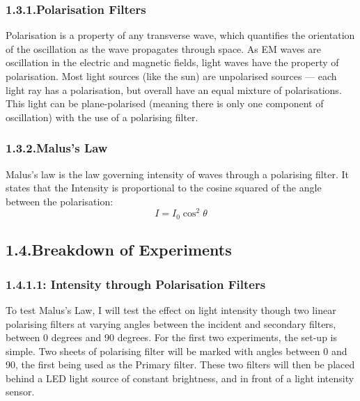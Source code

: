 \documentclass{article}
\begin{document}
\subsubsection{1.3.1.\hspace*{0.5em}Polarisation Filters}\label{sec-polarisation-filters}%

\noindent{}Polarisation is a property of any transverse wave, which quantifies the orientation of the oscillation as the wave propagates through space. As EM waves are oscillation in the electric and magnetic fields, light waves have the property of polarisation. Most light sources (like the sun) are unpolarised sources — each light ray has a polarisation, but overall have an equal mixture of polarisations. This light can be plane-polarised (meaning there is only one component of oscillation) with the use of a polarising filter.%

\subsubsection{1.3.2.\hspace*{0.5em}Malus’s Law}\label{sec-maluss-law}%

\noindent{}Malus's law is the law governing intensity of waves through a polarising filter. It states that the Intensity is proportional to the cosine squared of the angle between the polarisation:%
\label{}%
\noindent{}
\noindent\[%
I=I_0\cos^2\theta
\]%

\subsection{1.4.\hspace*{0.5em}Breakdown of Experiments}\label{sec-breakdown-of-experiments}%

\subsubsection{1.4.1.\hspace*{0.5em}1: Intensity through Polarisation Filters}\label{sec-1--intensity-through-polarisation-filters}%

\noindent{}To test Malus's Law, I will test the effect on light intensity though two linear polarising filters at varying angles between the incident and secondary filters, between 0 degrees and 90 degrees. For the first two experiments, the set-up is simple. Two sheets of polarising filter will be marked with angles between 0 and 90, the first being used as the Primary filter. These two filters will then be placed behind a LED light source of constant brightness, and in front of a light intensity sensor.%
\end{document}
